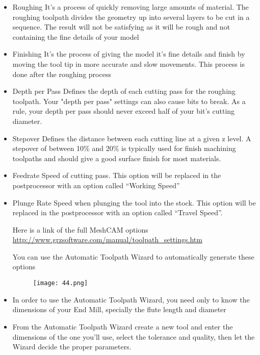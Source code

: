 \begin{itemize}
	\item Roughing
	\newline
	It’s a process of quickly removing large amounts of material.  The roughing toolpath divides the geometry up into several layers to be cut in a sequence.  The result will not be satisfying as it will be rough and not containing the fine details of your model
	\item Finishing
	\newline
	It’s the process of giving the model it’s fine details and finish by moving the tool tip in more accurate and slow movements. This process is done after the roughing process
	\item Depth per Pass
	\newline
	Defines the depth of each cutting pass for the roughing toolpath. Your "depth per pass" settings can also cause bits to break. As a rule, your depth per pass should never exceed half of your bit's cutting diameter. 
	\item Stepover
	\newline
	Defines the distance between each cutting line at a given z level. A stepover of between 10\% and 20\% is typically used for finish machining toolpaths and should give a good surface finish for most materials. 
	\item Feedrate
	\newline
	Speed of cutting pass. This option will be replaced in the postprocessor with an option called “Working Speed”
	\item Plunge Rate
	Speed when plunging the tool into the stock. This option will be replaced in the postprocessor with an option called “Travel Speed”.
	
	Here is a link of the full MeshCAM options 
	\newline
	\url{http://www.grzsoftware.com/manual/toolpath_settings.htm}
	\newline
	
	You can use the Automatic Toolpath Wizard to automatically generate these options
	\begin{figure}[H]
		\centering
		\texttt{[image: 44.png]}
	\end{figure}


\item In order to use the Automatic Toolpath Wizard, you need only to know the dimensions of your End Mill, specially the flute length and diameter

\item From the Automatic Toolpath Wizard create a new tool and enter the dimensions of the one you’ll use, select the tolerance and quality, then let the Wizard decide the proper parameters.


\end{itemize}
